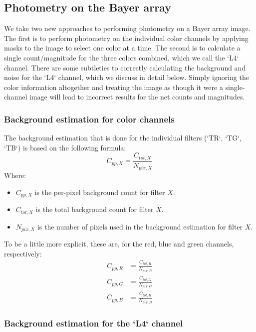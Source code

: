 \documentclass[12pt]{article}
\begin{document}
\subsection{Photometry on the Bayer array}

We take two new approaches to performing photometry on a Bayer array image. The first is to perform photometry
on the individual color channels by applying masks to the image to select one color at a time. The second is to
calculate a single count/magnitude for the three colors combined, which we call the `L4` channel. There are some subtleties to
correctly calculating the background and noise for the `L4` channel, which we discuss in detail below. Simply ignoring
the color information altogether and treating the image as though it were a single-channel image will lead to incorrect
results for the net counts and magnitudes.

\subsubsection{Background estimation for color channels}

The background estimation that is done for the individual filters (`TR`,
`TG`, `TB`) is based on the following formula:
\begin{equation}
C_{pp, X} = \frac{C_{tot, X}}{N_{pix, X}}
\end{equation}
Where:
\begin{itemize}
    \item $C_{pp, X}$ is the per-pixel background count for filter $X$.
    \item $C_{tot, X}$ is the total background count for filter $X$.
    \item $N_{pix, X}$ is the number of pixels used in the background estimation for filter $X$.
\end{itemize}

To be a little more explicit, these are, for the red, blue and green
 channels, respectively:
\begin{align}
C_{pp, R} &= \frac{C_{tot, R}}{N_{pix, R}}\\
C_{pp, G} &= \frac{C_{tot, G}}{N_{pix, G}}\\
C_{pp, B} &= \frac{C_{tot, B}}{N_{pix, B}}
\end{align}

\subsubsection{Background estimation for the `L4` channel}
\end{document}
